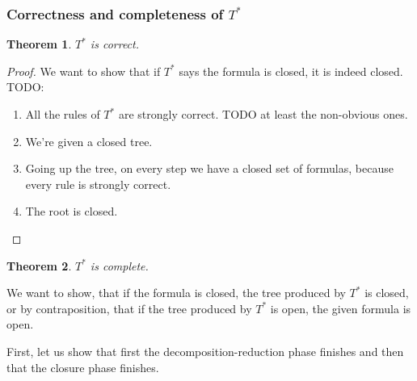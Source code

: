 \documentclass{article}
\newtheorem{theorem}{Theorem}
\theoremstyle{definition}
\newcommand*{\Ts}{T^*}
\begin{document}
\subsubsection{Correctness and completeness of $\Ts$}
\begin{theorem}
    $\Ts$ is correct.
\end{theorem}

\begin{proof}
We want to show that if $\Ts$ says the formula is closed, it is indeed closed. TODO:
\begin{enumerate}
    \item All the rules of $\Ts$ are strongly correct. TODO at least the non-obvious ones.
    \item We're given a closed tree.
    \item Going up the tree, on every step we have a closed set of formulas, because every rule is strongly correct.
    \item The root is closed.
\end{enumerate}
\end{proof}

\begin{theorem}
    $\Ts$ is complete.
\end{theorem}

We want to show, that if the formula is closed, the tree produced by $\Ts$ is closed, or by contraposition, that if the tree produced by $\Ts$ is open, the given formula is open.


First, let us show that first the decomposition-reduction phase finishes and then that the closure phase finishes.
\end{document}
